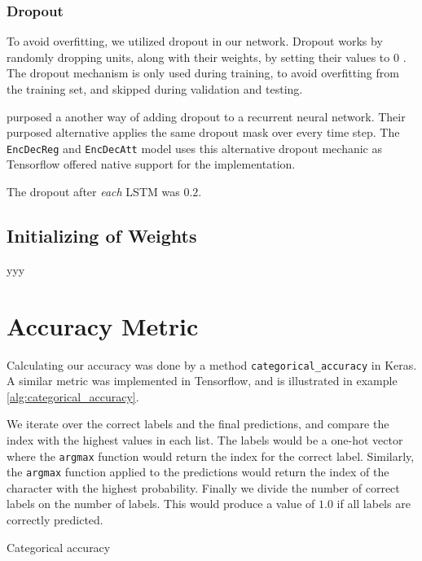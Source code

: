 \subsubsection{Dropout}
To avoid overfitting, we utilized dropout in our network. Dropout works by randomly dropping units, along with their weights, by setting their values to \(0\) \citep{srivastava2014dropout}. The dropout mechanism is only used during training, to avoid overfitting from the training set, and skipped during validation and testing.

\citep{gal2016theoretically} purposed a another way of adding dropout to a recurrent neural network. Their purposed alternative applies the same dropout mask over every time step. The {\tt EncDecReg} and {\tt EncDecAtt} model uses this alternative dropout mechanic as Tensorflow offered native support for the implementation.

The dropout after \emph{each} LSTM was \(0.2\).

\subsection{Initializing of Weights}
yyy


\section{Accuracy Metric}
Calculating our accuracy was done by a method {\tt categorical\_accuracy} in Keras. A similar metric was implemented in Tensorflow, and is illustrated in example \ref{alg:categorical_accuracy}.

We iterate over the correct labels and the final predictions, and compare the index with the highest values in each list. The labels would be a one-hot vector where the {\tt argmax} function would return the index for the correct label. Similarly, the {\tt argmax} function applied to the predictions would return the index of the character with the highest probability. Finally we divide the number of correct labels on the number of labels. This would produce a value of \(1.0\) if all labels are correctly predicted.

\begin{algorithm}
    \caption{Categorical accuracy
        \label{alg:categorical_accuracy}}
    \begin{algorithmic}[1]
        \Statex
                \EndIf
            \EndFor
        \State {}
        \EndFunction
    \end{algorithmic}
\end{algorithm}

